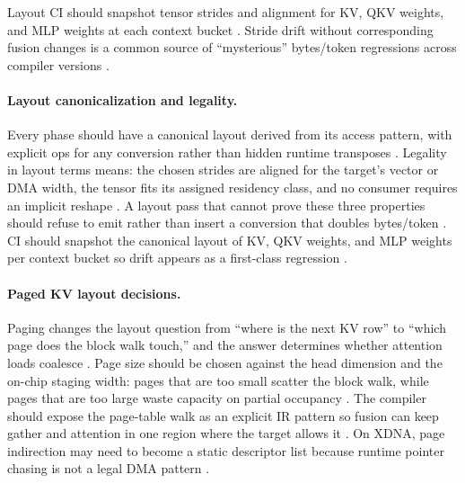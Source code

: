 Layout CI should snapshot tensor strides and alignment for KV, QKV weights, and MLP weights at each context bucket \citep{kwon2023vllm,yirage2026,chen2020compilerbasedhardw,patel2025llminference,semianalysis2024tma,liu2024deepseekv3,memoryfloor2026,taxbreak2026,dlbook,amd2024xdna,amd2024aie}. Stride drift without corresponding fusion changes is a common source of ``mysterious'' bytes/token regressions across compiler versions \citep{memoryfloor2026,taxbreak2026,yirage2026,chen2020compilerbasedhardw,patel2025llminference}.

\paragraph{Layout canonicalization and legality.}
Every phase should have a canonical layout derived from its access pattern, with explicit ops for any conversion rather than hidden runtime transposes \citep{semianalysis2024tma,yirage2026,chen2020compilerbasedhardw}. Legality in layout terms means: the chosen strides are aligned for the target's vector or DMA width, the tensor fits its assigned residency class, and no consumer requires an implicit reshape \citep{nvidia2022hopper,amd2024aie,patel2025llminference}. A layout pass that cannot prove these three properties should refuse to emit rather than insert a conversion that doubles bytes/token \citep{memoryfloor2026,taxbreak2026}. CI should snapshot the canonical layout of KV, QKV weights, and MLP weights per context bucket so drift appears as a first-class regression \citep{chen2020compilerbasedhardw,dlbook}.

\paragraph{Paged KV layout decisions.}
Paging changes the layout question from ``where is the next KV row'' to ``which page does the block walk touch,'' and the answer determines whether attention loads coalesce \citep{kwon2023vllm,dao2023flashdecoding,patel2025llminference}. Page size should be chosen against the head dimension and the on-chip staging width: pages that are too small scatter the block walk, while pages that are too large waste capacity on partial occupancy \citep{semianalysis2024tma,memoryfloor2026}. The compiler should expose the page-table walk as an explicit IR pattern so fusion can keep gather and attention in one region where the target allows it \citep{yirage2026,chen2020compilerbasedhardw}. On XDNA, page indirection may need to become a static descriptor list because runtime pointer chasing is not a legal DMA pattern \citep{amd2024xdna,amd2024aie}.

